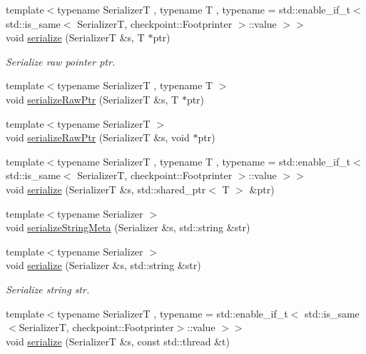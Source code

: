 \begin{DoxyCompactItemize}
\item 
{\footnotesize template$<$typename SerializerT , typename T , typename  = std\+::enable\+\_\+if\+\_\+t$<$    std\+::is\+\_\+same$<$      Serializer\+T,      checkpoint\+::\+Footprinter    $>$\+::value  $>$$>$ }\\void \hyperlink{namespacecheckpoint_a5242b8701b19ff5eeb7587fb4a07bfe9}{serialize} (SerializerT \&s, T $\ast$ptr)
\begin{DoxyCompactList}\small\item\em Serialize raw pointer {\ttfamily ptr}. \end{DoxyCompactList}\item 
{\footnotesize template$<$typename SerializerT , typename T $>$ }\\void \hyperlink{namespacecheckpoint_a6113644a35f5023a57e2ed3ca4814490}{serialize\+Raw\+Ptr} (SerializerT \&s, T $\ast$ptr)
\item 
{\footnotesize template$<$typename SerializerT $>$ }\\void \hyperlink{namespacecheckpoint_aaadeb0ab61d069afc8a97ec6b6dc630c}{serialize\+Raw\+Ptr} (SerializerT \&s, void $\ast$ptr)
\item 
{\footnotesize template$<$typename SerializerT , typename T , typename  = std\+::enable\+\_\+if\+\_\+t$<$    std\+::is\+\_\+same$<$      Serializer\+T,      checkpoint\+::\+Footprinter    $>$\+::value  $>$$>$ }\\void \hyperlink{namespacecheckpoint_aff1bebba5ce7fda79f83d2af8c859254}{serialize} (SerializerT \&s, std\+::shared\+\_\+ptr$<$ T $>$ \&ptr)
\item 
{\footnotesize template$<$typename Serializer $>$ }\\void \hyperlink{namespacecheckpoint_a1ea8e1ef9d0a10d26df77cb5309435aa}{serialize\+String\+Meta} (Serializer \&s, std\+::string \&str)
\item 
{\footnotesize template$<$typename Serializer $>$ }\\void \hyperlink{namespacecheckpoint_aef8e8717e4cc129379525653730c4eba}{serialize} (Serializer \&s, std\+::string \&str)
\begin{DoxyCompactList}\small\item\em Serialize string {\ttfamily str}. \end{DoxyCompactList}\item 
{\footnotesize template$<$typename SerializerT , typename  = std\+::enable\+\_\+if\+\_\+t$<$    std\+::is\+\_\+same$<$\+Serializer\+T, checkpoint\+::\+Footprinter$>$\+::value  $>$$>$ }\\void \hyperlink{namespacecheckpoint_ab9c05efe18a47d990fb20e84f73e9943}{serialize} (SerializerT \&s, const std\+::thread \&t)

\end{DoxyCompactItemize}

